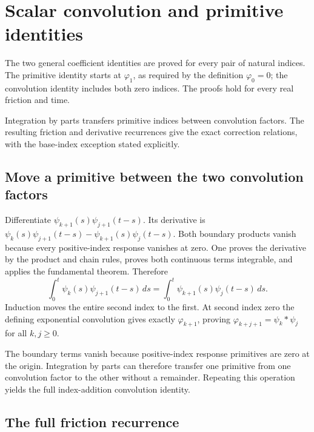 \documentclass[11pt,a4paper]{report}
\begin{document}
\section{\texorpdfstring{Scalar convolution and primitive identities}{Scalar convolution and primitive identities}}
\label{proof-module-KineticLangevin-ScalarConvolution-lean}


The two general coefficient identities are proved for every pair of natural indices. The primitive identity starts at \(\varphi _{1}\), as required by the definition \(\varphi _{0}=0\); the convolution identity includes both zero indices. The proofs hold for every real friction and time.



Integration by parts transfers primitive indices between convolution factors. The resulting friction and derivative recurrences give the exact correction relations, with the base-index exception stated explicitly.

\subsection{\texorpdfstring{Move a primitive between the two convolution factors}{Move a primitive between the two convolution factors}}
\label{report-step-KineticLangevin-ScalarConvolution-lean-1}


Differentiate \(\psi_{k+1}(s)\psi_{j+1}(t-s)\). Its derivative is \(\psi_k(s)\psi_{j+1}(t-s)-\psi_{k+1}(s)\psi_j(t-s)\). Both boundary products vanish because every positive-index response vanishes at zero. One proves the derivative by the product and chain rules, proves both continuous terms integrable, and applies the fundamental theorem. Therefore \[\int_0^t\psi_k(s)\psi_{j+1}(t-s)\,ds=\int_0^t\psi_{k+1}(s)\psi_j(t-s)\,ds.\] Induction moves the entire second index to the first. At second index zero the defining exponential convolution gives exactly \(\varphi_{k+1}\), proving \(\varphi_{k+j+1}=\psi_k*\psi_j\) for all \(k,j\ge0\).



The boundary terms vanish because positive-index response primitives are zero at the origin. Integration by parts can therefore transfer one primitive from one convolution factor to the other without a remainder. Repeating this operation yields the full index-addition convolution identity.

\subsection{\texorpdfstring{The full friction recurrence}{The full friction recurrence}}
\label{report-step-KineticLangevin-ScalarConvolution-lean-2}
\end{document}
